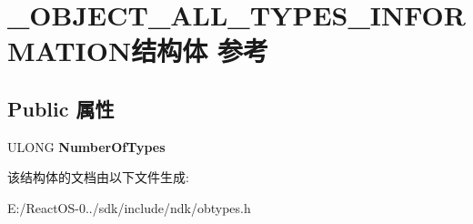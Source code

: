\hypertarget{struct___o_b_j_e_c_t___a_l_l___t_y_p_e_s___i_n_f_o_r_m_a_t_i_o_n}{}\section{\+\_\+\+O\+B\+J\+E\+C\+T\+\_\+\+A\+L\+L\+\_\+\+T\+Y\+P\+E\+S\+\_\+\+I\+N\+F\+O\+R\+M\+A\+T\+I\+O\+N结构体 参考}
\label{struct___o_b_j_e_c_t___a_l_l___t_y_p_e_s___i_n_f_o_r_m_a_t_i_o_n}
\subsection*{Public 属性}
\begin{DoxyCompactItemize}
\item 
\mbox{\label{struct___o_b_j_e_c_t___a_l_l___t_y_p_e_s___i_n_f_o_r_m_a_t_i_o_n_aac3cd0896f84acaef7fba52f77d23d9e}} 
U\+L\+O\+NG {\bfseries Number\+Of\+Types}
\end{DoxyCompactItemize}


该结构体的文档由以下文件生成\+:\begin{DoxyCompactItemize}
\item 
E\+:/\+React\+O\+S-\/0../sdk/include/ndk/obtypes.\+h\end{DoxyCompactItemize}
